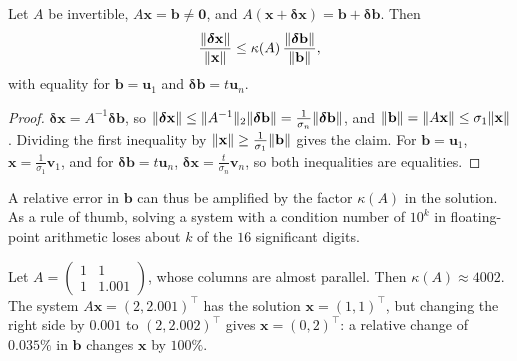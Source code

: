 \begin{theorem}\label{L2-thm:condition}
    Let $A$ be invertible, $A\mathbf{x} = \mathbf{b} \neq \mathbf{0}$, and $A(\mathbf{x} + \boldsymbol{\delta}\mathbf{x}) = \mathbf{b} + \boldsymbol{\delta}\mathbf{b}$. Then
    \[\frac{\lVert \boldsymbol{\delta}\mathbf{x} \rVert}{\lVert \mathbf{x} \rVert} \leq \kappa(A)\,\frac{\lVert \boldsymbol{\delta}\mathbf{b} \rVert}{\lVert \mathbf{b} \rVert},\]
    with equality for $\mathbf{b} = \mathbf{u}_1$ and $\boldsymbol{\delta}\mathbf{b} = t\mathbf{u}_n$.
\end{theorem}

\begin{proof}
    $\boldsymbol{\delta}\mathbf{x} = A^{-1}\boldsymbol{\delta}\mathbf{b}$, so $\lVert \boldsymbol{\delta}\mathbf{x} \rVert \leq \lVert A^{-1} \rVert_2\lVert \boldsymbol{\delta}\mathbf{b} \rVert = \frac{1}{\sigma_n}\lVert \boldsymbol{\delta}\mathbf{b} \rVert$, and $\lVert \mathbf{b} \rVert = \lVert A\mathbf{x} \rVert \leq \sigma_1\lVert \mathbf{x} \rVert$. Dividing the first inequality by $\lVert \mathbf{x} \rVert \geq \frac{1}{\sigma_1}\lVert \mathbf{b} \rVert$ gives the claim. For $\mathbf{b} = \mathbf{u}_1$, $\mathbf{x} = \frac{1}{\sigma_1}\mathbf{v}_1$, and for $\boldsymbol{\delta}\mathbf{b} = t\mathbf{u}_n$, $\boldsymbol{\delta}\mathbf{x} = \frac{t}{\sigma_n}\mathbf{v}_n$, so both inequalities are equalities.
\end{proof}

A relative error in $\mathbf{b}$ can thus be amplified by the factor $\kappa(A)$ in the solution. As a rule of thumb, solving a system with a condition number of $10^k$ in floating-point arithmetic loses about $k$ of the $16$ significant digits.

\begin{example}\label{L2-ex:ill-conditioned}
    Let $A = \begin{pmatrix} 1 & 1 \\ 1 & 1.001 \end{pmatrix}$, whose columns are almost parallel. Then $\kappa(A) \approx 4002$. The system $A\mathbf{x} = (2, 2.001)^\top$ has the solution $\mathbf{x} = (1, 1)^\top$, but changing the right side by $0.001$ to $(2, 2.002)^\top$ gives $\mathbf{x} = (0, 2)^\top$: a relative change of $0.035\%$ in $\mathbf{b}$ changes $\mathbf{x}$ by $100\%$.
\end{example}

